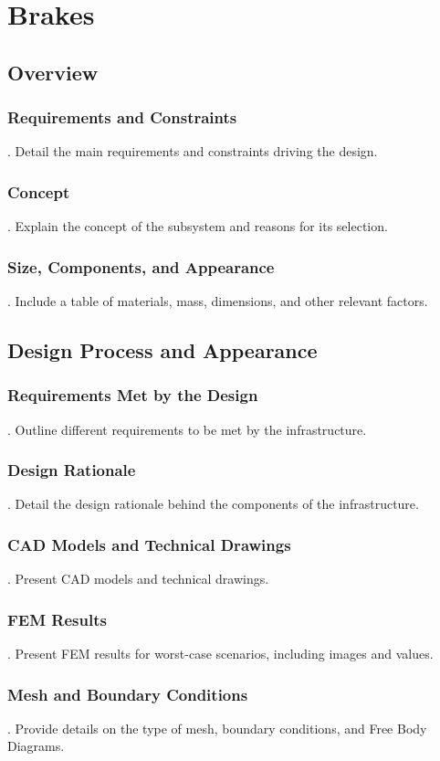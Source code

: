 \section{Brakes}
\subsection{Overview}
\subsubsection{Requirements and Constraints}
.  Detail the main requirements and constraints driving the design.
\subsubsection{Concept}
.  Explain the concept of the subsystem and reasons for its selection.
\subsubsection{Size, Components, and Appearance}
.  Include a table of materials, mass, dimensions, and other relevant factors.

\subsection{Design Process and Appearance}
\subsubsection{Requirements Met by the Design}
.  Outline different requirements to be met by the infrastructure.
\subsubsection{Design Rationale}
.  Detail the design rationale behind the components of the infrastructure.
\subsubsection{CAD Models and Technical Drawings}
.  Present CAD models and technical drawings.
\subsubsection{FEM Results}
.  Present FEM results for worst-case scenarios, including images and values.
\subsubsection{Mesh and Boundary Conditions}
.  Provide details on the type of mesh, boundary conditions, and Free Body Diagrams.
